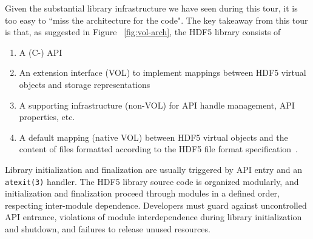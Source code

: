 Given the substantial library infrastructure we have seen during this tour, it is too easy to ``miss the architecture for the code". The key takeaway from this tour is that, as suggested in Figure ~\ref{fig:vol-arch}, the HDF5 library consists of
\begin{enumerate}
    \item A (C-) API
    \item An extension interface (VOL) to implement mappings between HDF5 virtual objects and storage representations
    \item A supporting infrastructure (non-VOL) for API handle management, API properties, etc.
    \item A default mapping (native VOL) between HDF5 virtual objects and the content of files formatted according to the HDF5 file format specification~\cite{ffmt}.
\end{enumerate}

Library initialization and finalization are usually triggered by API entry and an \texttt{atexit(3)} handler. The HDF5 library source code is organized modularly, and initialization and finalization proceed through modules in a defined order, respecting inter-module dependence. Developers must guard against uncontrolled API entrance, violations of module interdependence during library initialization and shutdown, and failures to release unused resources.